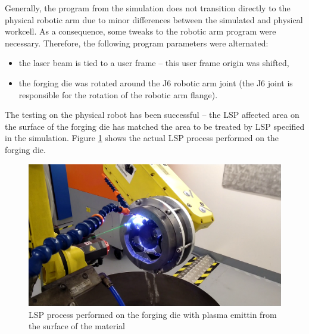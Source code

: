 Generally, the program from the simulation does not transition directly to the physical robotic arm due to minor differences between the simulated and physical workcell.  As a consequence, some tweaks to the robotic arm program were necessary. Therefore, the following program parameters were alternated:

\begin{itemize}

\item the laser beam is tied to a user frame -- this user frame origin was shifted,

\item the forging die was rotated around the J6 robotic arm joint (the J6 joint is responsible for the rotation of the robotic arm flange).
 
\end{itemize}

The testing on the physical robot has been successful -- the LSP affected area on the surface of the forging die has matched the area to be treated by LSP specified in the simulation. Figure \ref{fig:peening} shows the actual LSP process performed on the forging die. 

\begin{figure}[h]
    \centering
    \includegraphics[width=0.9\linewidth]{img/peening_v2.png}
    \caption{LSP process performed on the forging die with plasma emittin from the surface of the material}
    \label{fig:peening}
\end{figure}



